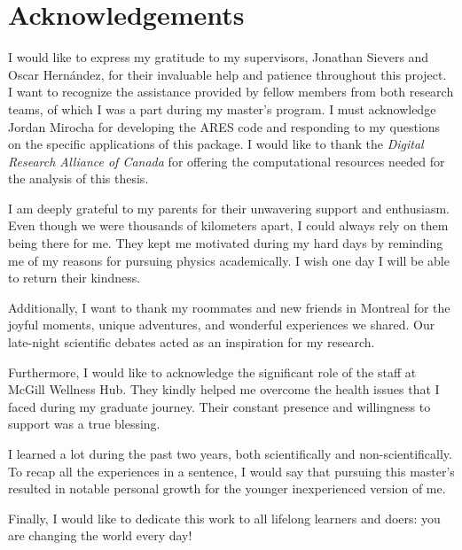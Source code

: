 \documentclass[12pt, TexShade, letterpaper]{report}
\begin{document}
\chapter*{Acknowledgements}
	\label{chap:acknowledgments}
I would like to express my gratitude to my supervisors, Jonathan Sievers and Oscar Hernández, for their invaluable help and patience throughout this project. I want to recognize the assistance provided by fellow members from both research teams, of which I was a part during my master's program. I must acknowledge Jordan Mirocha for developing the ARES code and responding to my questions on the specific applications of this package. I would like to thank the \emph{Digital Research Alliance of Canada} for offering the computational resources needed for the analysis of this thesis.\par
I am deeply grateful to my parents for their unwavering support and enthusiasm. Even though we were thousands of kilometers apart, I could always rely on them being there for me. They kept me motivated during my hard days by reminding me of my reasons for pursuing physics academically. I wish one day I will be able to return their kindness.\par
Additionally, I want to thank my roommates and new friends in Montreal for the joyful moments, unique adventures, and wonderful experiences we shared. Our late-night scientific debates acted as an inspiration for my research.\par
Furthermore, I would like to acknowledge the significant role of the staff at McGill Wellness Hub. They kindly helped me overcome the health issues that I faced during my graduate journey. Their constant presence and willingness to support was a true blessing.\par
I learned a lot during the past two years, both scientifically and non-scientifically. To recap all the experiences in a sentence, I would say that pursuing this master's resulted in notable personal growth for the younger inexperienced version of me.\par

 Finally, I would like to dedicate this work to all lifelong learners and doers: you are changing the world every day!
	\tableofcontents\thispagestyle{plain}
 \glsunsetall
	\listoffigures\thispagestyle{plain}
 \glsresetall
 \glsunsetall
	\listoftables
  \glsresetall
	\glsaddall
	\setlength\LTleft{0pt}
	\setlength\LTright{0pt}
	\setlength\glsdescwidth{0.8\hsize}
	\printglossary[title={List of Acronyms}]
\end{document}
